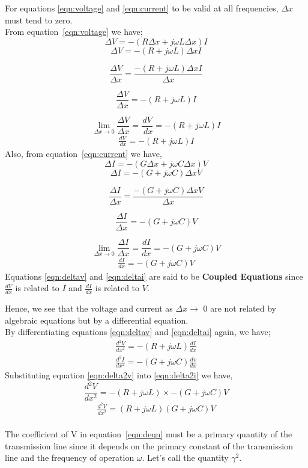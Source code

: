 For equations \ref{eqn:voltage} and \ref{eqn:current} to be valid at all frequencies, $ \Delta x $ must tend to zero.\\
From equation~\ref{eqn:voltage} we have;
\[ \Delta V = - (R \Delta x + j\omega L\Delta x)I \]
\[ \Delta V = - (R + j\omega L)\Delta x I \]

\[ \frac{	\Delta V }{\Delta x} = \frac{ - (R  + j\omega L)\Delta x I}{\Delta x} \]

\[ \frac{	\Delta V }{\Delta x} =  - (R  + j\omega L) I \]

\[ \lim_{ \Delta x\to 0} \frac{\Delta V}{ \Delta x} = \frac{ dV}{ \ dx} = - (R + j \omega L)I \]
 \begin{align}
\frac{ dV}{ \ dx} = - (R + j \omega L)I 
\label{eqn:deltav}
 \end{align} 
Also, from equation~\ref{eqn:current} we have,
\[ \Delta I = - (G \Delta x + j\omega C\Delta x)V \]
\[ \Delta I = - (G + j\omega C)\Delta x V \]

\[ \frac{	\Delta I }{\Delta x} = \frac{ - (G + j\omega C)\Delta x V}{\Delta x} \]
   
\[ \frac{	\Delta I }{\Delta x} =  - (G + j\omega C) V \]
   
\[ \lim_{ \Delta x\to 0}	\frac{ \Delta I}{ \Delta x} = \frac{dI}{dx} = - (G + j\omega C)V \]
\begin{align}
\frac{dI}{dx} = - (G + j\omega C)V 
\label{eqn:deltai}
\end{align}
Equations \ref{eqn:deltav} and \ref{eqn:deltai} are said to be \textbf{Coupled Equations} since $ \frac{dV}{dx} $ is related to $I$ and $ \frac{dI}{dx} $  is related to $V$.

Hence, we see that the voltage and current as $ \Delta x \rightarrow $ 0 are not related by algebraic equations but by a differential equation.\\
By differentiating equations \ref{eqn:deltav} and \ref{eqn:deltai} again, we have; 
\begin{align}
\frac{d^{2}V}{dx^{2}} = - (R + j\omega L)\frac{dI}{dx} 
\label{eqn:delta2v}
\end{align}
\begin{align}
\frac{d^{2}I}{dx^{2}} = - (G + j\omega C)\frac{dv}{dx}
\label{eqn:delta2i}
\end{align}
Substituting equation \ref{eqn:delta2v} into \ref{eqn:delta2i} we have,
\[ 	\frac{d^{2}V}{dx^{2}} = - (R + j\omega L)\times {- (G + j\omega C)V} \]
\begin{align}
 \frac{d^{2}V}{dx^{2}} = (R + j\omega L)(G + j\omega C)V 
\label{eqn:deqn}
\end{align}   
\\
The coefficient of V in equation~\ref{eqn:deqn} must be a primary quantity of the transmission line since it depends on the primary constant of the transmission line and the frequency of operation $ \omega$. Let's call the quantity $ \gamma^{2}. $ 

